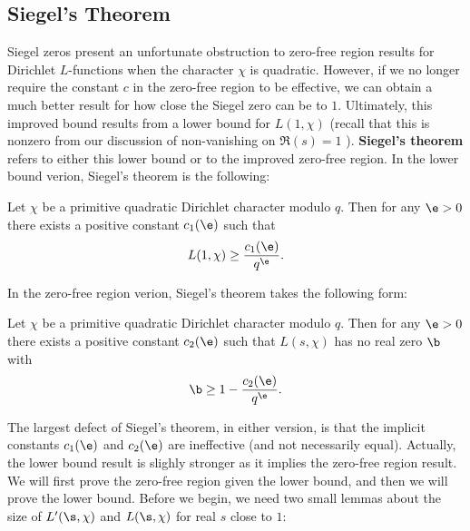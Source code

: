     \subsection*{Siegel's Theorem}
      Siegel zeros present an unfortunate obstruction to zero-free region results for Dirichlet $L$-functions when the character $\chi$ is quadratic. However, if we no longer require the constant $c$ in the zero-free region to be effective, we can obtain a much better result for how close the Siegel zero can be to $1$. Ultimately, this improved bound results from a lower bound for $L(1,\chi)$ (recall that this is nonzero from our discussion of non-vanishing on $\Re(s) = 1$ ). \textbf{Siegel's theorem} refers to either this lower bound or to the improved zero-free region. In the lower bound verion, Siegel's theorem is the following:

      \begin{theorem}
        Let $\chi$ be a primitive quadratic Dirichlet character modulo $q$. Then for any $\e > 0$ there exists a positive constant $c_{1}(\e)$ such that
        \[
          L(1,\chi) \ge \frac{c_{1}(\e)}{q^{\e}}.
        \]
      \end{theorem}

      In the zero-free region verion, Siegel's theorem takes the following form:

      \begin{theorem}
        Let $\chi$ be a primitive quadratic Dirichlet character modulo $q$. Then for any $\e > 0$ there exists a positive constant $c_{2}(\e)$ such that $L(s,\chi)$ has no real zero $\b$ with
        \[
          \b \ge 1-\frac{c_{2}(\e)}{q^{\e}}.
        \]
      \end{theorem}

      The largest defect of Siegel's theorem, in either version, is that the implicit constants $c_{1}(\e)$ and $c_{2}(\e)$ are ineffective (and not necessarily equal). Actually, the lower bound result is slighly stronger as it implies the zero-free region result. We will first prove the zero-free region given the lower bound, and then we will prove the lower bound. Before we begin, we need two small lemmas about the size of $L'(\s,\chi)$ and $L(\s,\chi)$ for real $s$ close to $1$:

